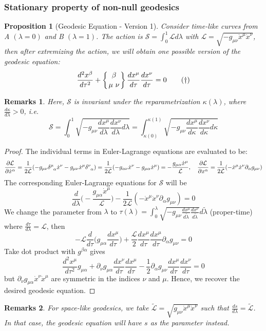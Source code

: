 \documentclass[a4paper]{article}
\newtheorem{remarks}{Remarks}[section]
\theoremstyle{new}
\newtheorem{prop}{Proposition}[section]
\begin{document}
\subsubsection*{Stationary property of non-null geodesics}
\begin{prop}[Geodesic Equation - Version 1]
Consider time-like curves from  A $(\lambda=0)$ and B $(\lambda=1)$. The action is $\mathcal{S}=\int_0^1\mathcal{L}d\lambda$ with $\mathcal{L}=\sqrt{-g_{\mu\nu}\dot{x}^\mu\dot{x}^\nu}$, then after extremizing the action, we will obtain one possible version of the geodesic equation:
\begin{equation}
    \frac{d^2x^\beta}{d\tau^2}+\left \{ {\beta \atop \mu\ \nu}\right \}\frac{dx^\mu}{d\tau}\frac{dx^\nu}{d\tau}=0\tag{\dag}
\end{equation}
\end{prop}
\begin{remarks}
Here, $\mathcal{S}$ is invariant under the reparametrization $\kappa(\lambda)$, where $\frac{d\kappa}{d\lambda}>0$, i.e. 
$$\mathcal{S}=\int_0^1\sqrt{-g_{\mu\nu}\frac{dx^\mu}{d\lambda}\frac{dx^\nu}{d\lambda}d\lambda}=\int_{\kappa(0)}^{\kappa(1)}\sqrt{-g_{\mu\nu}\frac{dx^\mu}{d\kappa}\frac{dx^\nu}{d\kappa}d\kappa}$$
\end{remarks}
\begin{proof}
The individual terms in Euler-Lagrange equations are evaluated to be:
$$\frac{\partial\mathcal{L}}{\partial\dot{x}^\alpha}=\frac{1}{2\mathcal{L}}(-g_{\mu\nu}\tensor*{\delta}{*_{}^{\mu}_{\alpha}}\dot{x}^\nu-g_{\mu\nu}\dot{x}^\mu\tensor*{\delta}{*_{}^{\nu}_{\alpha}})=\frac{1}{2\mathcal{L}}(-g_{\alpha\nu}\dot{x}^\nu-g_{\mu\alpha}\dot{x}^\mu)=-\frac{g_{\mu\alpha}\dot{x}^\mu}{\mathcal{L}},\quad\frac{\partial\mathcal{L}}{\partial x^\alpha}=\frac{1}{2\mathcal{L}}(-\dot{x}^\mu\dot{x}^\nu\partial_\alpha g_{\mu\nu})$$
The corresponding Euler-Lagrange equations for $\mathcal{S}$ will be 
$$\frac{d}{d\lambda}\bigg(-\frac{g_{\mu\alpha}\dot{x}^\mu}{\mathcal{L}}\bigg)-\frac{1}{2\mathcal{L}}(-\dot{x}^\mu\dot{x}^\nu\partial_\alpha g_{\mu\nu})=0$$
We change the parameter from $\lambda$ to $\tau(\lambda)=\int_0^\lambda\sqrt{-g_{\mu\nu}\frac{dx^\mu}{d\tilde{\lambda}}\frac{dx^\nu}{d\tilde{\lambda}}}d\tilde{\lambda}$ (proper-time) where $\frac{d\tau}{d\lambda}=\mathcal{L}$, then
$$-\mathcal{L}\frac{d}{d\tau}\bigg(g_{\mu\alpha}\frac{dx^\mu}{d\tau}\bigg)+\frac{\mathcal{L}}{2}\frac{dx^\mu}{d\tau}\frac{dx^\mu}{d\tau}\partial_\alpha g_{\mu\nu}=0$$
Take dot product with $g^{\beta\alpha}$ gives
$$\frac{d^2x^\mu}{d\tau^2}g_{\mu\alpha}+\partial_\nu g_{\mu\alpha}\frac{dx^\nu}{d\tau}\frac{dx^\mu}{d\tau}-\frac{1}{2}\partial_\alpha g_{\mu\nu}\frac{dx^\mu}{d\tau}\frac{dx^\nu}{d\tau}=0$$
but $\partial_\nu g_{\mu\alpha}\dot{x}^\nu\dot{x}^\mu$ are symmetric in the indices $\nu$ and $\mu$. Hence, we recover the desired geodesic equation. 
\end{proof}
\begin{remarks}
For space-like geodesics, we take $\tilde{\mathcal{L}}=\sqrt{g_{\mu\nu}\dot{x}^\mu\dot{x}^\nu}$ such that $\frac{ds}{d\lambda}=\tilde{\mathcal{L}}$. In that case, the geodesic equation will have $s$ as the parameter instead.
\end{remarks}
\end{document}
